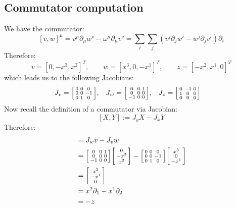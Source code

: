 \documentclass{article}
\begin{document}
 		\subsection{Commutator computation}
 			We have the commutator:
 			$$ \left[ v,w\right]^\mu = v^\mu \partial_\mu w^\nu - \omega^\mu \partial_\mu v^\nu = \sum_i \sum_j \left( v^j \partial_j w^i - w^j \partial_j v^i \right) \partial_i$$
 			Therefore:
 			$$ v = \left[0, -x^3, x^2 \right]^T, \quad\quad w = \left[x^3, 0, -x^1 \right]^T, \quad \quad z = \left[-x^2, x^1, 0 \right]^T$$
 			which leads us to the following Jacobians:
 		\begin{align*}
 			J_{v} &= 
 			\begin{bsmallmatrix}
 				0		&		0		&		0		\\
 				0		&	0		&	-1		\\
 				0		&	1	&	0
 			\end{bsmallmatrix},
 			&
 			J_{w}  &= 
 			\begin{bsmallmatrix}
 				0	&		0		&	1		\\
 				0		&		0		&	0			\\
 				-1	&		0		&	0
 			\end{bsmallmatrix}, &
 			J_z &= 
 			\begin{bsmallmatrix}
 				0	&	-1		&		0		\\
 				1		&	0		&	0		\\
 				0		&	0		&	0
 			\end{bsmallmatrix}
 		\end{align*}
 			Now recall the definition of a commutator via Jacobian:
 			$$ [X,Y] := J_y X - J_x Y$$
 			Therefore:\vspace{-1cm}
 			\begin{align*}
 				[v,w] &= J_w v - J_v w \\
 				&= \begin{bsmallmatrix}
 					0	&	0	&	1 \\
 					0	&	0	&	0 \\
 					-1	&	0	&	0	
 				\end{bsmallmatrix}
 				\begin{bsmallmatrix}
 					0 \\-x^3 \\
 					x^2
 				\end{bsmallmatrix}
 				- \begin{bsmallmatrix}
 					0		&		0		&		0		\\
 					0		&	0		&	-1		\\
 					0		&	1	&	0
 				\end{bsmallmatrix} \begin{bsmallmatrix}
 					x^3 \\0 \\ -x^1
 				\end{bsmallmatrix} \\
 				&= \begin{bsmallmatrix}
 					x^2 \\ -x^1 \\ 0
 				\end{bsmallmatrix}\\
 				&= x^2 \partial_1 - x^1 \partial_2  \\
 				&= -z
 			\end{align*}
\end{document}
